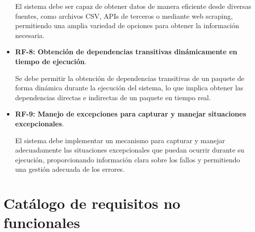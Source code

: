 \begin{itemize}
	      El sistema debe ser capaz de obtener datos de manera eficiente desde diversas fuentes, como archivos CSV, APIs de terceros o mediante web scraping, permitiendo una amplia variedad de opciones para obtener la información necesaria.

	\item \textbf{RF-8: Obtención de dependencias transitivas dinámicamente en tiempo de ejecución}.

	      Se debe permitir la obtención de dependencias transitivas de un paquete de forma dinámica durante la ejecución del sistema, lo que implica obtener las dependencias directas e indirectas de un paquete en tiempo real.

	\item \textbf{RF-9: Manejo de excepciones para capturar y manejar situaciones excepcionales}.

	      El sistema debe implementar un mecanismo para capturar y manejar adecuadamente las situaciones excepcionales que puedan ocurrir durante su ejecución, proporcionando información clara sobre los fallos y permitiendo una gestión adecuada de los errores.
\end{itemize}

\section{Catálogo de requisitos no funcionales}

